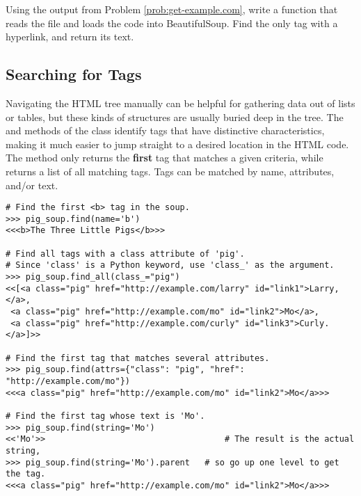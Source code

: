 \begin{problem}
Using the output from Problem \ref{prob:get-example.com}, write a function that reads the file and loads the code into BeautifulSoup.
Find the only  tag with a hyperlink, and return its text.
\end{problem}

\begin{comment}
\begin{problem} %

Write a function that returns the following line using three different methods.
\begin{lstlisting}
<<'More information...'>>
\end{lstlisting}
The function should accept an integer.
If the integer is 1, find the line using tag names and the \li{.string} method.
If the integer is 2, find the line by traversing through the children of the body tag with repeated calls to \li{.contents}.
If the integer is 3, find the line by using navigation between siblings and \li{.string}.
\end{problem}
\end{comment}

\subsection*{Searching for Tags} %

Navigating the HTML tree manually can be helpful for gathering data out of lists or tables, but these kinds of structures are usually buried deep in the tree.
The  and  methods of the  class identify tags that have distinctive characteristics, making it much easier to jump straight to a desired location in the HTML code.
The  method only returns the \textbf{first} tag that matches a given criteria, while  returns a list of all matching tags.
Tags can be matched by name, attributes, and/or text.

\begin{lstlisting}
# Find the first <b> tag in the soup.
>>> pig_soup.find(name='b')
<<<b>The Three Little Pigs</b>>>

# Find all tags with a class attribute of 'pig'.
# Since 'class' is a Python keyword, use 'class_' as the argument.
>>> pig_soup.find_all(class_="pig")
<<[<a class="pig" href="http://example.com/larry" id="link1">Larry,</a>,
 <a class="pig" href="http://example.com/mo" id="link2">Mo</a>,
 <a class="pig" href="http://example.com/curly" id="link3">Curly.</a>]>>

# Find the first tag that matches several attributes.
>>> pig_soup.find(attrs={"class": "pig", "href": "http://example.com/mo"})
<<<a class="pig" href="http://example.com/mo" id="link2">Mo</a>>>

# Find the first tag whose text is 'Mo'.
>>> pig_soup.find(string='Mo')
<<'Mo'>>                                    # The result is the actual string,
>>> pig_soup.find(string='Mo').parent   # so go up one level to get the tag.
<<<a class="pig" href="http://example.com/mo" id="link2">Mo</a>>>
\end{lstlisting}

